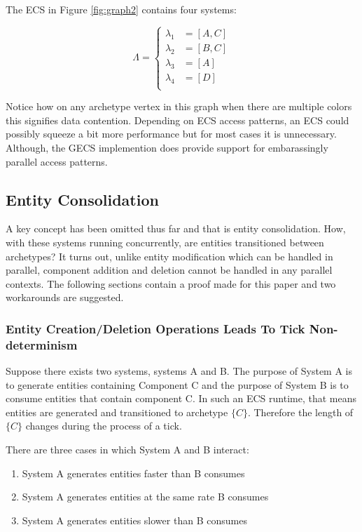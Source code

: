 The ECS in Figure \ref{fig:graph2} contains four systems: 

\begin{equation*}
    \Lambda = \begin{cases}
        \lambda_1 &= [A,C] \\
        \lambda_2 &= [B,C] \\ 
        \lambda_3 &= [A] \\ 
        \lambda_4 &= [D] \\ 
    \end{cases}
\end{equation*}

Notice how on any archetype vertex in this graph when there are multiple colors this signifies data contention. Depending on ECS access patterns, an ECS could possibly squeeze a bit more performance but for most cases it is unnecessary. Although, the GECS implemention does provide support for embarassingly parallel access patterns. 

\subsection{Entity Consolidation}
A key concept has been omitted thus far and that is entity consolidation. How, with these systems running concurrently, are entities transitioned between archetypes? It turns out, unlike entity modification which can be handled in parallel, component addition and deletion cannot be handled in any parallel contexts. The following sections contain a proof made for this paper and two workarounds are suggested.

\subsubsection{Entity Creation/Deletion Operations Leads To Tick Non-determinism}
\label{sec:proof1}
Suppose there exists two systems, systems A and B. The purpose of System A is to generate entities containing Component C and the purpose of System B is to consume entities that contain component C. In such an ECS runtime, that means entities are generated and transitioned to archetype $\{C\}$. Therefore the length of $\{C\}$ changes during the process of a tick. 

There are three cases in which System A and B interact:
\begin{enumerate}
    \item System A generates entities faster than B consumes
    \item System A generates entities at the same rate B consumes
    \item System A generates entities slower than B consumes
\end{enumerate}

